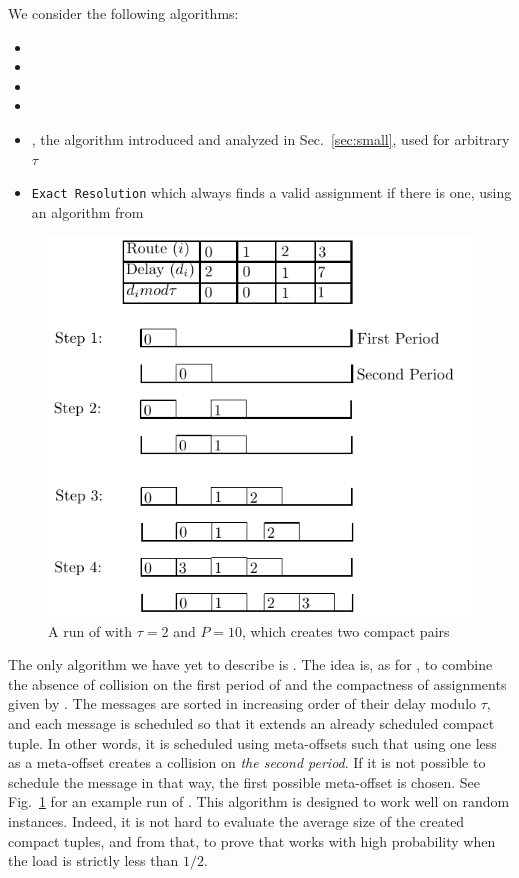 \documentclass[pdflatex,sn-mathphys,iicol]{sn-jnl}%
\theoremstyle{thmstyleone}%
\theoremstyle{thmstyletwo}%
\theoremstyle{thmstylethree}%
\begin{document}
We consider the following algorithms:
\begin{itemize}
  \item \firstfit
  \item \metaoffset
  \item \compactpair
  \item \compactfit
  \item \greedyuniform, the algorithm introduced and analyzed in Sec.~\ref{sec:small}, used for arbitrary $\tau$
  \item \texttt{Exact Resolution} which always finds a valid assignment if there is one, using an algorithm from~\cite{bartharxiv2018deterministic}  
\end{itemize}

\begin{figure}[h]
 \begin{center}
\includegraphics[scale=0.8]{compactfit}
\end{center}
\caption{A run of \compactfit with $\tau = 2$ and $P=10$, which creates two compact pairs}
\label{fig:compactfit}
\end{figure}

The only algorithm we have yet to describe is \compactfit. The idea is, as for \compactpair, to combine the absence of collision on the first period of \metaoffset and the compactness of assignments given by \firstfit.
The messages are sorted in increasing order of their delay modulo $\tau$, and each message is scheduled so that it extends an already scheduled compact tuple. 
In other words, it is scheduled using meta-offsets such that using one less as a meta-offset creates a collision on \emph{the second period}. If it is not possible to schedule the message in that way, the first possible meta-offset is chosen. See Fig.~\ref{fig:compactfit} for an example run of \compactfit. This algorithm is designed to work well on random instances. Indeed, it is not hard to evaluate the average size of the created compact tuples, and from that, to prove that \compactfit works with high probability when the load is strictly less than $1/2$.
\end{document}
